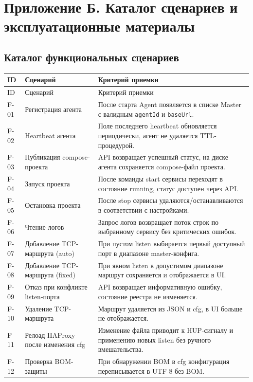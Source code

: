\section{Приложение Б. Каталог сценариев и эксплуатационные материалы}

\subsection{Каталог функциональных сценариев}

\begin{longtable}{p{}p{}p{}}
\toprule
ID & Сценарий & Критерий приемки \\
\midrule
\endfirsthead
\toprule
ID & Сценарий & Критерий приемки \\
\midrule
\endhead
F-01 & Регистрация агента & После старта Agent появляется в списке Master с валидным \texttt{agentId} и \texttt{baseUrl}. \\
F-02 & Heartbeat агента & Поле последнего heartbeat обновляется периодически, агент не удаляется TTL-процедурой. \\
F-03 & Публикация compose-проекта & API возвращает успешный статус, на диске агента сохраняется compose-файл проекта. \\
F-04 & Запуск проекта & После команды start сервисы переходят в состояние running, статус доступен через API. \\
F-05 & Остановка проекта & После stop сервисы удаляются/останавливаются в соответствии с настройками. \\
F-06 & Чтение логов & Запрос логов возвращает поток строк по выбранному сервису без критических ошибок. \\
F-07 & Добавление TCP-маршрута (auto) & При пустом listen выбирается первый доступный порт в диапазоне master-конфига. \\
F-08 & Добавление TCP-маршрута (fixed) & При явном listen в допустимом диапазоне маршрут сохраняется и отображается в UI. \\
F-09 & Отказ при конфликте listen-порта & API возвращает информативную ошибку, состояние реестра не изменяется. \\
F-10 & Удаление TCP-маршрута & Маршрут удаляется из JSON и cfg, в UI больше не отображается. \\
F-11 & Релоад HAProxy после изменения cfg & Изменение файла приводит к HUP-сигналу и применению новых listen без ручного вмешательства. \\
F-12 & Проверка BOM-защиты & При обнаружении BOM в cfg конфигурация переписывается в UTF-8 без BOM. \\

\end{longtable}
